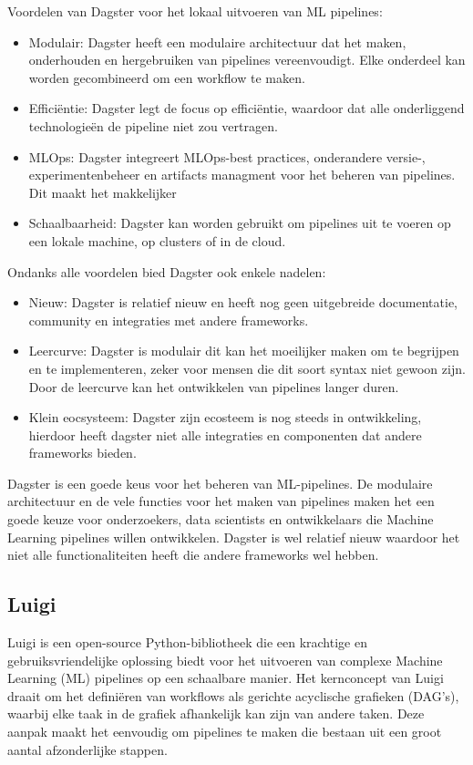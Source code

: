 Voordelen van Dagster voor het lokaal uitvoeren van ML pipelines:
\begin{itemize}
    \item Modulair: Dagster heeft een modulaire architectuur dat het maken, onderhouden en hergebruiken van pipelines vereenvoudigt. Elke onderdeel kan worden gecombineerd om een workflow te maken.
    \item Efficiëntie: Dagster legt de focus op efficiëntie, waardoor dat alle onderliggend technologieën de pipeline niet zou vertragen.
    \item MLOps: Dagster integreert MLOps-best practices, onderandere versie-, experimentenbeheer en artifacts managment voor het beheren van pipelines. Dit maakt het makkelijker 
    \item Schaalbaarheid: Dagster kan worden gebruikt om pipelines uit te voeren op een lokale machine, op clusters of in de cloud.
  \end{itemize}
Ondanks alle voordelen bied Dagster ook enkele nadelen:
\begin{itemize}
    \item Nieuw: Dagster is relatief nieuw en heeft nog geen uitgebreide documentatie, community en integraties met andere frameworks.
    \item Leercurve: Dagster is modulair dit kan het moeilijker maken om te begrijpen en te implementeren, zeker voor mensen die dit soort syntax niet gewoon zijn. Door de leercurve kan het ontwikkelen van pipelines langer duren.
    \item Klein eocsysteem: Dagster zijn ecosteem is nog steeds in ontwikkeling, hierdoor heeft dagster niet alle integraties en componenten dat andere frameworks bieden.
  \end{itemize}
  Dagster is een goede keus voor het beheren van ML-pipelines. De modulaire architectuur en de vele functies voor het maken van pipelines maken het een goede keuze voor onderzoekers, data scientists en ontwikkelaars die Machine Learning pipelines willen ontwikkelen. Dagster is wel relatief nieuw waardoor het niet alle functionaliteiten heeft die andere frameworks wel hebben.

\subsection{Luigi}

Luigi is een open-source Python-bibliotheek die een krachtige en gebruiksvriendelijke oplossing biedt voor het uitvoeren van complexe Machine Learning (ML) pipelines op een schaalbare manier. Het kernconcept van Luigi draait om het definiëren van workflows als gerichte acyclische grafieken (DAG's), waarbij elke taak in de grafiek afhankelijk kan zijn van andere taken. Deze aanpak maakt het eenvoudig om pipelines te maken die bestaan uit een groot aantal afzonderlijke stappen.

